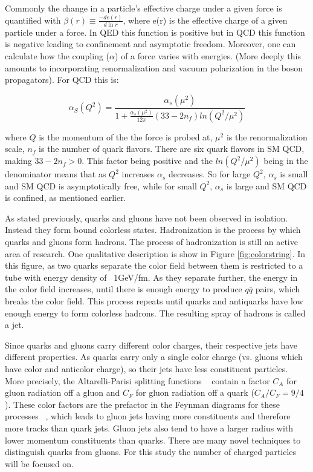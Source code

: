 Commonly the change in a particle's effective charge under a given force is quantified with  $\beta(r) \equiv \frac{-de(r)}{d\ln r}$, where e(r) is the effective charge of a given particle under a force. In QED this function is positive but in QCD this function is negative leading to confinement and asymptotic freedom. Moreover, one can calculate how the coupling ($\alpha$) of a force varies with energies. (More deeply this amounts to incorporating renormalization and vacuum polarization in the boson propagators). For QCD this is:

\begin{equation}
\alpha_{S}(Q^{2}) = \frac{ \alpha_{s}(\mu^{2}) } { 1+ \frac{ \alpha_{s}( \mu^{2} ) } { 12\pi } ( 33-2n_{f} ) ln( Q^{2}/\mu^{2})}  
\end{equation}


where $Q$ is the momentum of the the force is probed at, $\mu^{2}$ is the renormalization scale, $n_{f}$ is the number of quark flavors. There are six quark flavors in SM QCD, making $33-2n_{f} > 0$. This factor being positive and the $ln(Q^{2}/\mu^{2})$  being in the denominator means that as $Q^{2}$ increases $\alpha_{s}$ decreases. So for large $Q^{2}$, $\alpha_{s}$ is small and SM QCD is asymptotically free, while for small $Q^{2}$, $\alpha_{s}$ is large and SM QCD is confined, as mentioned earlier. 

As stated previously, quarks and gluons have not been observed in isolation. Instead they form bound colorless states. Hadronization is the process by which quarks and gluons form hadrons. The process of hadronization is still an active area of research. One qualitative description is show in Figure \ref{fig:colorstring}. In this figure, as two quarks separate the color field between them is restricted to a tube with energy density of ~1GeV/fm. As they separate further, the energy in the color field increases, until there is enough energy to produce $q\bar{q}$ pairs, which breaks the color field. This process repeats until quarks and antiquarks have low enough energy to form colorless hadrons. The resulting spray of hadrons is called a jet.

Since quarks and gluons carry different color charges, their respective jets have different properties. As quarks carry only a single color charge (vs. gluons which have color and anticolor charge), so their jets have less constituent particles. More precisely, the Altarelli-Parisi splitting functions ~\cite{altarelli} contain a factor $C_{A}$ for gluon radiation off a gluon and $C_{F}$ for gluon radiation off a quark ($C_{A}/C_{F} = 9/4$). These color factors are the prefactor in the Feynman diagrams for these processes ~\cite{colorfactor}, which leads to gluon jets having more constituents and therefore more tracks than quark jets. Gluon jets also tend to have a larger radius with lower momentum constituents than quarks. There are many novel techniques to distinguish quarks from gluons. For this study the number of charged particles will be focused on.  

